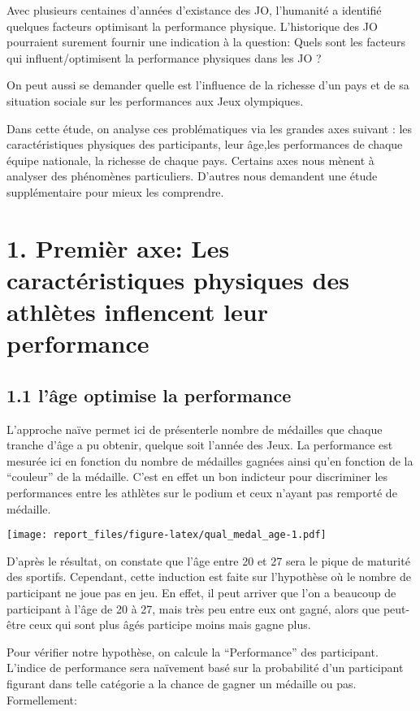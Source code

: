 \documentclass[11pt,]{article}
\begin{document}
Avec plusieurs centaines d'années d'existance des JO, l'humanité a
identifié quelques facteurs optimisant la performance physique.
L'historique des JO pourraient surement fournir une indication à la
question: Quels sont les facteurs qui influent/optimisent la performance
physiques dans les JO ?

On peut aussi se demander quelle est l'influence de la richesse d'un
pays et de sa situation sociale sur les performances aux Jeux
olympiques.

Dans cette étude, on analyse ces problématiques via les grandes axes
suivant : les caractéristiques physiques des participants, leur âge,les
performances de chaque équipe nationale, la richesse de chaque pays.
Certains axes nous mènent à analyser des phénomènes particuliers.
D'autres nous demandent une étude supplémentaire pour mieux les
comprendre.

\section{1. Premièr axe: Les caractéristiques physiques des athlètes
inflencent leur
performance}\label{premier-axe-les-caracteristiques-physiques-des-athletes-inflencent-leur-performance}

\subsection{1.1 l'âge optimise la
performance}\label{lage-optimise-la-performance}

L'approche naïve permet ici de présenterle nombre de médailles que
chaque tranche d'âge a pu obtenir, quelque soit l'année des Jeux. La
performance est mesurée ici en fonction du nombre de médailles gagnées
ainsi qu'en fonction de la ``couleur'' de la médaille. C'est en effet un
bon indicteur pour discriminer les performances entre les athlètes sur
le podium et ceux n'ayant pas remporté de médaille.

\texttt{[image: report\_files/figure-latex/qual\_medal\_age-1.pdf]}

D'après le résultat, on constate que l'âge entre 20 et 27 sera le pique
de maturité des sportifs. Cependant, cette induction est faite sur
l'hypothèse où le nombre de participant ne joue pas en jeu. En effet, il
peut arriver que l'on a beaucoup de participant à l'âge de 20 à 27, mais
très peu entre eux ont gagné, alors que peut-être ceux qui sont plus
âgés participe moins mais gagne plus.

Pour vérifier notre hypothèse, on calcule la ``Performance'' des
participant. L'indice de performance sera naïvement basé sur la
probabilité d'un participant figurant dans telle catégorie a la chance
de gagner un médaille ou pas. Formellement:
\end{document}
